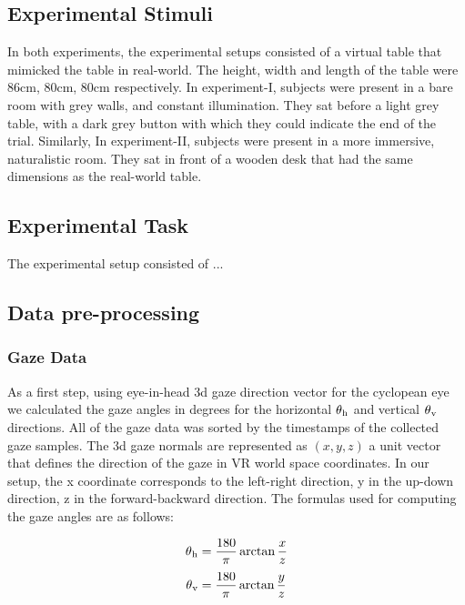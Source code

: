 \subsection{Experimental Stimuli}
In both experiments, the experimental setups consisted of a virtual table that mimicked the table in real-world. The height, width and length of the table were 86cm, 80cm, 80cm respectively. In experiment-I, subjects were present in a bare room with grey walls, and constant illumination. They sat before a light grey table, with a dark grey button with which they could indicate the end of the trial. Similarly, In experiment-II, subjects were present in a more immersive, naturalistic room. They sat in front of a wooden desk that had the same dimensions as the real-world table.



\subsection{Experimental Task}
The experimental setup consisted of ... 



\subsection{Data pre-processing}

\subsubsection{Gaze Data}

As a first step, using eye-in-head 3d gaze direction vector for the cyclopean eye we calculated the gaze angles in degrees for the horizontal $\theta\textsubscript{h}$ and vertical $\theta\textsubscript{v}$ directions. All of the gaze data was sorted by the timestamps of the collected gaze samples. The 3d gaze normals are represented as $(x, y, z)$ a unit vector that defines the direction of the gaze in VR world space coordinates. In our setup, the x coordinate corresponds to the left-right direction, y in the up-down direction, z in the forward-backward direction. The formulas used for computing the gaze angles are as follows:

 \begin{equation*}\label{eq:h_angle}
     \theta\textsubscript{h} = \frac{180}{\pi} \arctan{\frac{x}{z}}
 \end{equation*}   
  \begin{equation*}\label{eq:v_angle}
     \theta\textsubscript{v} = \frac{180}{\pi} \arctan{\frac{y}{z}} 
 \end{equation*}   
 

